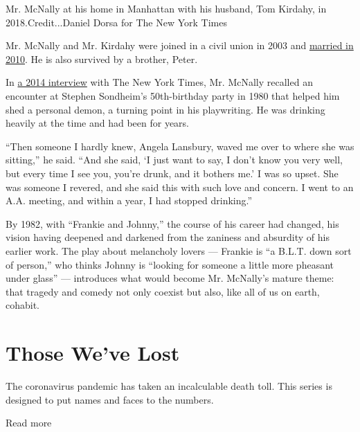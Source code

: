 Mr. McNally at his home in Manhattan with his husband, Tom Kirdahy, in
2018.Credit...Daniel Dorsa for The New York Times

Mr. McNally and Mr. Kirdahy were joined in a civil union in 2003 and
\href{https://www.nytimes3xbfgragh.onion/2017/11/15/fashion/weddings/tom-kirdahy-and-terrence-mcnally-an-immediate-and-lasting-need.html}{married
in 2010}. He is also survived by a brother, Peter.

In
\href{https://www.nytimes3xbfgragh.onion/2014/03/02/theater/mcnallys-mothers-and-sons-gauges-a-changed-america.html?searchResultPosition=3}{a
2014 interview} with The New York Times, Mr. McNally recalled an
encounter at Stephen Sondheim's 50th-birthday party in 1980 that helped
him shed a personal demon, a turning point in his playwriting. He was
drinking heavily at the time and had been for years.

``Then someone I hardly knew, Angela Lansbury, waved me over to where
she was sitting,'' he said. ``And she said, `I just want to say, I don't
know you very well, but every time I see you, you're drunk, and it
bothers me.' I was so upset. She was someone I revered, and she said
this with such love and concern. I went to an A.A. meeting, and within a
year, I had stopped drinking.''

By 1982, with ``Frankie and Johnny,'' the course of his career had
changed, his vision having deepened and darkened from the zaniness and
absurdity of his earlier work. The play about melancholy lovers ---
Frankie is ``a B.L.T. down sort of person,'' who thinks Johnny is
``looking for someone a little more pheasant under glass'' ---
introduces what would become Mr. McNally's mature theme: that tragedy
and comedy not only coexist but also, like all of us on earth, cohabit.

\href{https://www.nytimes3xbfgragh.onion/interactive/2020/obituaries/people-died-coronavirus-obituaries.html?action=click\&pgtype=Article\&state=default\&region=BELOW_MAIN_CONTENT\&context=covid_obits_promo}{}

\hypertarget{those-weve-lost}{%
\section{Those We've Lost}\label{those-weve-lost}}

The coronavirus pandemic has taken an incalculable death toll. This
series is designed to put names and faces to the numbers.

Read more

